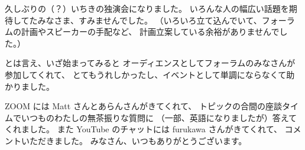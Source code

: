\documentclass[dvipdfmx,autodetect-engine,10pt,b5paper,papersize,openany,dvipsnames]{jsbook}
\begin{document}
久しぶりの（？）いちきの独演会になりました。
いろんな人の幅広い話題を期待してたみなさま、すみませんでした。
（いろいろ立て込んでいて、フォーラムの計画やスピーカーの手配など、
計画立案している余裕がありませんでした。）

とは言え、いざ始まってみると
オーディエンスとしてフォーラムのみなさんが参加してくれて、
とてもうれしかったし、イベントとして単調にならなくて助かりました。

\vspace{1cm}


ZOOM には Matt さんとあらんさんがきてくれて、
トピックの合間の座談タイムでいつものわたしの無茶振りな質問に
（一部、英語になりましたが）答えてくれました。
また YouTube のチャットには furukawa さんがきてくれて、
コメントいただきました。
みなさん、いつもありがとうございます。
\end{document}
